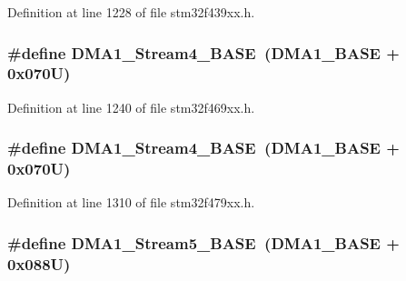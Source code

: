 Definition at line 1228 of file stm32f439xx.\+h.

\subsubsection[{\texorpdfstring{D\+M\+A1\+\_\+\+Stream4\+\_\+\+B\+A\+SE}{DMA1_Stream4_BASE}}]{\setlength{\rightskip}{0pt plus 5cm}\#define D\+M\+A1\+\_\+\+Stream4\+\_\+\+B\+A\+SE~({\bf D\+M\+A1\+\_\+\+B\+A\+SE} + 0x070\+U)}\hypertarget{group___peripheral__memory__map_ga757a3c0d866c0fe68c6176156065a26b}{}\label{group___peripheral__memory__map_ga757a3c0d866c0fe68c6176156065a26b}


Definition at line 1240 of file stm32f469xx.\+h.

\subsubsection[{\texorpdfstring{D\+M\+A1\+\_\+\+Stream4\+\_\+\+B\+A\+SE}{DMA1_Stream4_BASE}}]{\setlength{\rightskip}{0pt plus 5cm}\#define D\+M\+A1\+\_\+\+Stream4\+\_\+\+B\+A\+SE~({\bf D\+M\+A1\+\_\+\+B\+A\+SE} + 0x070\+U)}\hypertarget{group___peripheral__memory__map_ga757a3c0d866c0fe68c6176156065a26b}{}\label{group___peripheral__memory__map_ga757a3c0d866c0fe68c6176156065a26b}


Definition at line 1310 of file stm32f479xx.\+h.

\subsubsection[{\texorpdfstring{D\+M\+A1\+\_\+\+Stream5\+\_\+\+B\+A\+SE}{DMA1_Stream5_BASE}}]{\setlength{\rightskip}{0pt plus 5cm}\#define D\+M\+A1\+\_\+\+Stream5\+\_\+\+B\+A\+SE~({\bf D\+M\+A1\+\_\+\+B\+A\+SE} + 0x088\+U)}\hypertarget{group___peripheral__memory__map_ga0ded7bed8969fe2e2d616e7f90eb7654}{}\label{group___peripheral__memory__map_ga0ded7bed8969fe2e2d616e7f90eb7654}


